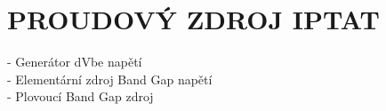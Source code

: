 \section{PROUDOVÝ ZDROJ IPTAT}
- Generátor dVbe napětí\\
- Elementární zdroj Band Gap napětí\\
- Plovoucí Band Gap zdroj\\